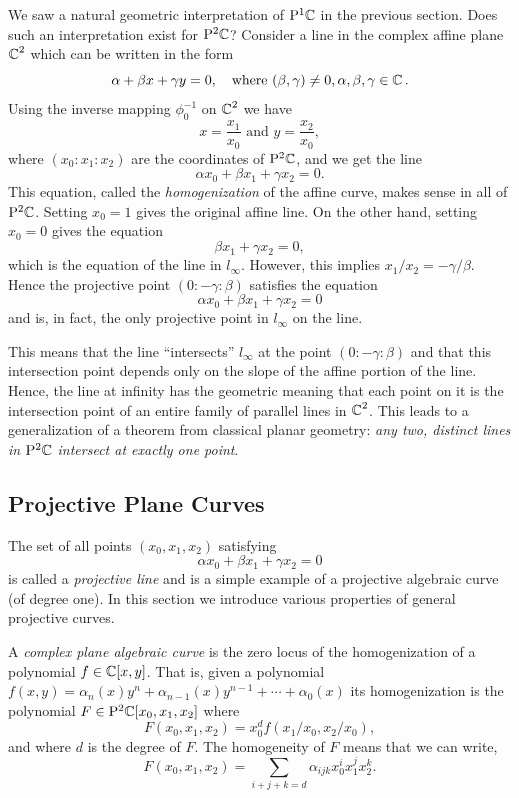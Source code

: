 We saw a natural geometric interpretation of $\mathrm{P}^1 \!\operatorname{\mathbb{C}}$ in the previous
section. Does such an interpretation exist for $\mathrm{P}^2 \!\operatorname{\mathbb{C}}$? Consider a line in
the complex affine plane $\operatorname{\mathbb{C}}^2$ which can be written in the form
\[
  \alpha + \beta x + \gamma y = 0, \quad \text{where } (\beta,\gamma) \neq 0,
  \alpha, \beta, \gamma \in \operatorname{\mathbb{C}}.
\]
Using the inverse mapping $\phi_0^{-1}$ on $\operatorname{\mathbb{C}}^2$ we have
\[
  x = \frac{x_1}{x_0} \text{ and } y = \frac{x_2}{x_0},
\]
where $(x_0 : x_1 : x_2)$ are the coordinates of $\mathrm{P}^2 \!\operatorname{\mathbb{C}}$, and we get the
line
\[
  \alpha x_0 + \beta x_1 + \gamma x_2 = 0.
\]
This equation, called the {\it homogenization} of the affine curve, makes sense
in all of $\mathrm{P}^2 \!\operatorname{\mathbb{C}}$. Setting $x_0 = 1$ gives the original affine line. On the
other hand, setting $x_0 = 0$ gives the equation
\[
  \beta x_1 + \gamma x_2 = 0,
\]
which is the equation of the line in $l_\infty$. However, this implies $x_1 /
x_2 = - \gamma / \beta$. Hence the projective point $(0 : -\gamma : \beta)$
satisfies the equation
\[
  \alpha x_0 + \beta x_1 + \gamma x_2 = 0
\]
and is, in fact, the only projective point in $l_\infty$ on the line.

This means that the line ``intersects'' $l_\infty$ at the point $(0 : -\gamma :
\beta)$ and that this intersection point depends only on the slope of the affine
portion of the line. Hence, the line at infinity has the geometric meaning that
each point on it is the intersection point of an entire family of parallel lines
in $\operatorname{\mathbb{C}}^2$. This leads to a generalization of a theorem from classical planar
geometry: {\it any two, distinct lines in $\mathrm{P}^2 \!\operatorname{\mathbb{C}}$ intersect at exactly one
  point}.

\subsection{Projective Plane Curves} \label{sec: projective-plane-curves}

The set of all points $(x_0, x_1, x_2)$ satisfying
\[
  \alpha x_0 + \beta x_1 + \gamma x_2 = 0
\]
is called a {\it projective line} and is a simple example of a projective
algebraic curve (of degree one). In this section we introduce various properties
of general projective curves.

A {\it complex plane algebraic curve} is the zero locus of the homogenization of
a polynomial $f \in \operatorname{\mathbb{C}}[x,y]$. That is, given a polynomial $f(x,y) = \alpha_n(x)
y^n + \alpha_{n-1}(x)y^{n-1} + \cdots + \alpha_0(x)$ its homogenization is the
polynomial $F \in \mathrm{P}^2 \!\operatorname{\mathbb{C}}[x_0,x_1,x_2]$ where
\[
  F(x_0,x_1,x_2) = x_0^d f(x_1/x_0,x_2/x_0),
\]
and where $d$ is the degree of $F$. The homogeneity of $F$ means that we can
write,
\[
  F(x_0,x_1,x_2) = \sum_{i+j+k=d} \alpha_{ijk} x_0^i x_1^j x_2^k.
\]

